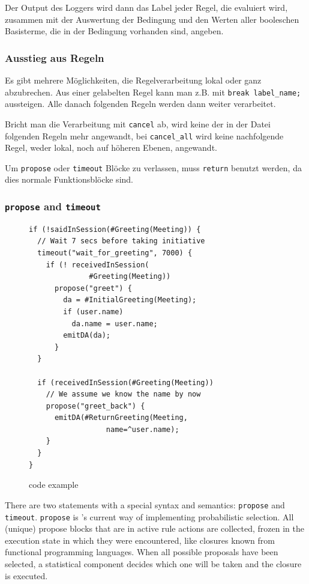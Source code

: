 Der Output des Loggers wird dann das Label jeder Regel, die evaluiert wird,
zusammen mit der Auswertung der Bedingung und den Werten aller booleschen
Basisterme, die in der Bedingung vorhanden sind, angeben.


\subsubsection{Ausstieg aus Regeln}

Es gibt mehrere Möglichkeiten, die Regelverarbeitung lokal oder ganz
abzubrechen. Aus einer gelabelten Regel kann man z.B. mit
\verb|break label_name;| aussteigen. Alle danach folgenden Regeln werden dann
weiter verarbeitet.

Bricht man die Verarbeitung mit \texttt{cancel} ab, wird keine der in
der Datei folgenden Regeln mehr angewandt, bei \texttt{cancel\_all} wird
keine nachfolgende Regel, weder lokal, noch auf höheren Ebenen, angewandt.

Um \texttt{propose} oder \texttt{timeout} Blöcke zu verlassen, muss
\texttt{return} benutzt werden, da dies normale Funktionsblöcke sind.

\subsubsection{\texttt{propose} and \texttt{timeout}}
\begin{figure}[htb]
  \centering\small%
\begin{verbatim}
if (!saidInSession(#Greeting(Meeting)) {
  // Wait 7 secs before taking initiative
  timeout("wait_for_greeting", 7000) {
    if (! receivedInSession(
              #Greeting(Meeting))
      propose("greet") {
        da = #InitialGreeting(Meeting);
        if (user.name)
          da.name = user.name;
        emitDA(da);
      }
  }

  if (receivedInSession(#Greeting(Meeting))
    // We assume we know the name by now
    propose("greet_back") {
      emitDA(#ReturnGreeting(Meeting,
                  name=^user.name);
    }
  }
}
\end{verbatim}\vspace*{-3ex}
  \caption{\vonda code example}
  \label{fig:propose}
\end{figure}

There are two statements with a special syntax and semantics: \texttt{propose}
and \texttt{timeout}. \texttt{propose} is \vonda's current way of implementing
probabilistic selection. All (unique) propose blocks that are in active rule
actions are collected, frozen in the execution state in which they were
encountered, like closures known from functional programming languages. When
all possible proposals have been selected, a statistical component decides
which one will be taken and the closure is executed.

